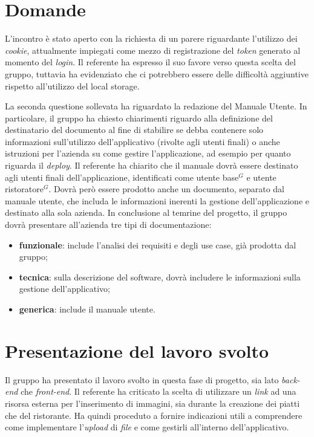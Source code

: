 \section{Domande}
L'incontro è stato aperto con la richiesta di un parere riguardante l'utilizzo dei \textit{cookie}, attualmente impiegati come mezzo di registrazione del \textit{token} generato al momento del \textit{login}. 
Il referente ha espresso il suo favore verso questa scelta del gruppo, tuttavia ha evidenziato che ci potrebbero essere delle difficoltà aggiuntive rispetto all'utilizzo del local storage.

La seconda questione sollevata ha riguardato la redazione del Manuale Utente. 
In particolare, il gruppo ha chiesto chiarimenti riguardo alla definizione del destinatario del documento al fine di stabilire se debba contenere solo informazioni sull'utilizzo dell'applicativo (rivolte agli utenti finali) o anche istruzioni per l'azienda su come gestire l'applicazione, ad esempio per quanto riguarda il \textit{deploy}. 
Il referente ha chiarito che il manuale dovrà essere destinato agli utenti finali dell'applicazione, identificati come utente base$^G$ e utente ristoratore$^G$.
Dovrà però essere prodotto anche un documento, separato dal manuale utente, che includa le informazioni inerenti la gestione dell'applicazione e destinato alla sola azienda.
In conclusione al temrine del progetto, il gruppo dovrà presentare all'azienda tre tipi di documentazione:
\begin{itemize}
    \item \textbf{funzionale}: include l'analisi dei requisiti e degli use case, già prodotta dal gruppo;
    \item \textbf{tecnica}: sulla descrizione del software, dovrà includere le informazioni sulla gestione dell'applicativo;
    \item \textbf{generica}: include il manuale utente.
\end{itemize}

\section{Presentazione del lavoro svolto}
Il gruppo ha presentato il lavoro svolto in questa fase di progetto, sia lato \textit{back-end} che \textit{front-end}.
Il referente ha criticato la scelta di utilizzare un \textit{link} ad una risorsa esterna per l'inserimento di immagini, sia durante la creazione dei piatti che del ristorante.
Ha quindi proceduto a fornire indicazioni utili a comprendere come implementare l'\textit{upload} di \textit{file} e come gestirli all'interno dell'applicativo.
